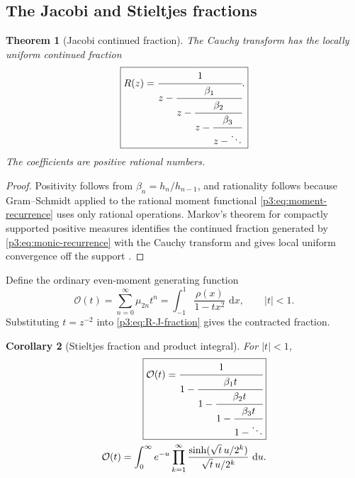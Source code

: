 \documentclass[11pt]{article}
\newtheorem{theorem}{Theorem}[section]
\newtheorem{corollary}[theorem]{Corollary}
\theoremstyle{definition}
\theoremstyle{remark}
\newcommand{\dd}{\,\mathrm d}
\newcommand{\cO}{\mathcal O}
\begin{document}
\subsection{The Jacobi and Stieltjes fractions}

\begin{theorem}[Jacobi continued fraction]\label{p3:thm:J-fraction}
The Cauchy transform has the locally uniform continued fraction
\begin{equation}
 \boxed{
 R(z)=\cfrac{1}{z-\cfrac{\beta_1}{z-\cfrac{\beta_2}{z-
           \cfrac{\beta_3}{z-\ddots}}}}.
 }                                                           \label{p3:eq:R-J-fraction}
\end{equation}
The coefficients are positive rational numbers.
\end{theorem}

\begin{proof}
Positivity follows from \(\beta_n=h_n/h_{n-1}\), and rationality follows because
Gram--Schmidt applied to the rational moment functional \eqref{p3:eq:moment-recurrence}
uses only rational operations.  Markov's theorem for compactly supported positive measures
identifies the continued fraction generated by \eqref{p3:eq:monic-recurrence} with the Cauchy
transform and gives local uniform convergence off the support \cite{p3:VanAssche1993,p3:SimonOPRL}.
\end{proof}

Define the ordinary even-moment generating function
\begin{equation}
 \cO(t)=\sum_{n=0}^{\infty}\mu_{2n}t^n
 =\int_{-1}^{1}\frac{\rho(x)}{1-tx^2}\,\dd x,
 \qquad |t|<1.                                               \label{p3:eq:O-def}
\end{equation}
Substituting \(t=z^{-2}\) into \eqref{p3:eq:R-J-fraction} gives the contracted fraction.

\begin{corollary}[Stieltjes fraction and product integral]\label{p3:cor:S-fraction}
For \(|t|<1\),
\begin{align}
 \boxed{
 \cO(t)=\cfrac{1}{1-\cfrac{\beta_1t}{1-\cfrac{\beta_2t}{1-
               \cfrac{\beta_3t}{1-\ddots}}}}
 }                                                           \label{p3:eq:O-S-fraction}\\
 \cO(t)=\int_0^{\infty}e^{-u}
 \prod_{k=1}^{\infty}
 \frac{\sinh(\sqrt t\,u/2^k)}{\sqrt t\,u/2^k}\,\dd u.    \label{p3:eq:O-product-integral}
\end{align}
\end{corollary}
\end{document}
